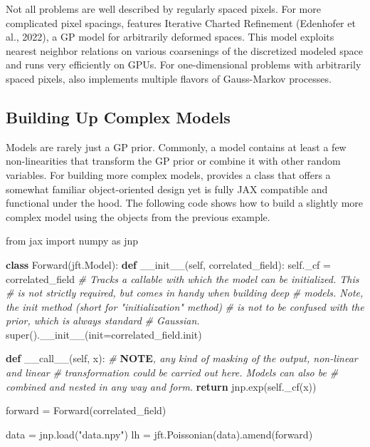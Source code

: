 \documentclass[10pt,a4paper,onecolumn]{article}
\let\textttOrig=\texttt
\def\texttt#1{\expandafter\textttOrig{\seqsplit{#1}}}
\newenvironment{Shaded}{}{}
\newcommand{\AlertTok}[1]{\textcolor[rgb]{1.00,0.00,0.00}{\textbf{#1}}}
\newcommand{\BuiltInTok}[1]{#1}
\newcommand{\CommentTok}[1]{\textcolor[rgb]{0.38,0.63,0.69}{\textit{#1}}}
\newcommand{\ControlFlowTok}[1]{\textcolor[rgb]{0.00,0.44,0.13}{\textbf{#1}}}
\newcommand{\FunctionTok}[1]{\textcolor[rgb]{0.02,0.16,0.49}{#1}}
\newcommand{\ImportTok}[1]{#1}
\newcommand{\KeywordTok}[1]{\textcolor[rgb]{0.00,0.44,0.13}{\textbf{#1}}}
\newcommand{\NormalTok}[1]{#1}
\newcommand{\OperatorTok}[1]{\textcolor[rgb]{0.40,0.40,0.40}{#1}}
\newcommand{\StringTok}[1]{\textcolor[rgb]{0.25,0.44,0.63}{#1}}
\newcommand{\VariableTok}[1]{\textcolor[rgb]{0.10,0.09,0.49}{#1}}
\begin{document}
Not all problems are well described by regularly spaced pixels. For more
complicated pixel spacings, \texttt{NIFTy.re} features Iterative Charted
Refinement (Edenhofer et al., 2022), a GP model for arbitrarily deformed
spaces. This model exploits nearest neighbor relations on various
coarsenings of the discretized modeled space and runs very efficiently
on GPUs. For one-dimensional problems with arbitrarily spaced pixels,
\texttt{NIFTy.re} also implements multiple flavors of Gauss-Markov
processes.

\hypertarget{building-up-complex-models}{%
\subsection{Building Up Complex
Models}\label{building-up-complex-models}}

Models are rarely just a GP prior. Commonly, a model contains at least a
few non-linearities that transform the GP prior or combine it with other
random variables. For building more complex models, \texttt{NIFTy.re}
provides a \texttt{Model} class that offers a somewhat familiar
object-oriented design yet is fully JAX compatible and functional under
the hood. The following code shows how to build a slightly more complex
model using the objects from the previous example.

\begin{Shaded}
\begin{Highlighting}[]
\ImportTok{from}\NormalTok{ jax }\ImportTok{import}\NormalTok{ numpy }\ImportTok{as}\NormalTok{ jnp}


\KeywordTok{class}\NormalTok{ Forward(jft.Model):}
  \KeywordTok{def} \FunctionTok{\_\_init\_\_}\NormalTok{(}\VariableTok{self}\NormalTok{, correlated\_field):}
    \VariableTok{self}\NormalTok{.\_cf }\OperatorTok{=}\NormalTok{ correlated\_field}
    \CommentTok{\# Tracks a callable with which the model can be initialized. This}
    \CommentTok{\# is not strictly required, but comes in handy when building deep}
    \CommentTok{\# models. Note, the init method (short for "initialization" method)}
    \CommentTok{\# is not to be confused with the prior, which is always standard}
    \CommentTok{\# Gaussian.}
    \BuiltInTok{super}\NormalTok{().}\FunctionTok{\_\_init\_\_}\NormalTok{(init}\OperatorTok{=}\NormalTok{correlated\_field.init)}

  \KeywordTok{def} \FunctionTok{\_\_call\_\_}\NormalTok{(}\VariableTok{self}\NormalTok{, x):}
    \CommentTok{\# }\AlertTok{NOTE}\CommentTok{, any kind of masking of the output, non{-}linear and linear}
    \CommentTok{\# transformation could be carried out here. Models can also be}
    \CommentTok{\# combined and nested in any way and form.}
    \ControlFlowTok{return}\NormalTok{ jnp.exp(}\VariableTok{self}\NormalTok{.\_cf(x))}


\NormalTok{forward }\OperatorTok{=}\NormalTok{ Forward(correlated\_field)}

\NormalTok{data }\OperatorTok{=}\NormalTok{ jnp.load(}\StringTok{"data.npy"}\NormalTok{)}
\NormalTok{lh }\OperatorTok{=}\NormalTok{ jft.Poissonian(data).amend(forward)}
\end{Highlighting}
\end{Shaded}
\end{document}
